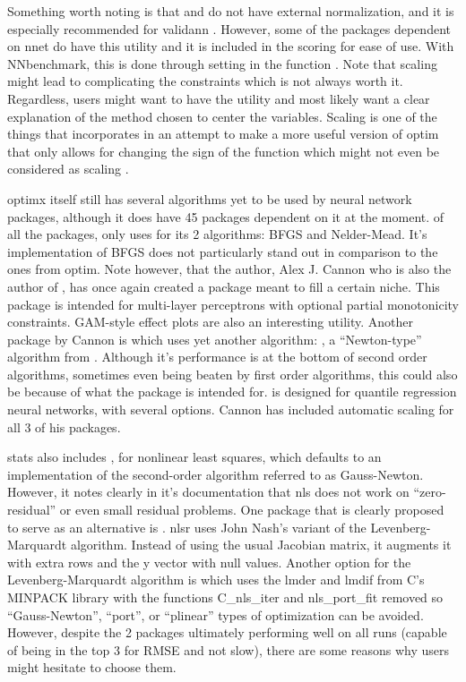 Something worth noting is that  and  do
not have external normalization, and it is especially recommended for
validann . However, some of the packages dependent on nnet do have this
utility and it is included in the scoring for ease of use. With
NNbenchmark, this is done through setting  in the
function . Note that scaling might lead to complicating
the constraints which is not always worth it. Regardless, users might
want to have the utility and most likely want a clear explanation of the
method chosen to center the variables. Scaling is one of the things that
 \citep{R-optimx} incorporates in an attempt to make a
more useful version of optim that only allows for changing the sign of
the function which might not even be considered as scaling
\citep{Nash-nlpor14}.

optimx itself still has several algorithms yet to be used by neural
network packages, although it does have 45 packages dependent on it at
the moment.  \citep{R-monmlp} of all the packages, only
 uses  for its 2 algorithms: BFGS and
Nelder-Mead. It's implementation of BFGS does not particularly stand out
in comparison to the ones from optim. Note however, that the author,
Alex J. Cannon who is also the author of , has once
again created a package meant to fill a certain niche. This package is
intended for multi-layer perceptrons with optional partial monotonicity
constraints. GAM-style effect plots are also an interesting utility.
Another package by Cannon is  \citep{R-qrnn} which uses
yet another algorithm: , a ``Newton-type'' algorithm from
. Although it's performance is at the bottom of second
order algorithms, sometimes even being beaten by first order algorithms,
this could also be because of what the package is intended for.
 is designed for quantile regression neural networks, with
several options. Cannon has included automatic scaling for all 3 of his
packages.

stats also includes , for nonlinear least squares, which
defaults to an implementation of the second-order algorithm referred to
as Gauss-Newton. However, it notes clearly in it's documentation that
nls does not work on ``zero-residual'' or even small residual problems.
One package that is clearly proposed to serve as an alternative is
 \citep{R-nlsr}. nlsr uses John Nash's variant of the
Levenberg-Marquardt algorithm. Instead of using the usual Jacobian
matrix, it augments it with extra rows and the y vector with null
values. Another option for the Levenberg-Marquardt algorithm is
 \citep{minpack.lm} which uses the lmder and lmdif
from C's MINPACK library with the functions C\_nls\_iter and
nls\_port\_fit removed so ``Gauss-Newton'', ``port'', or ``plinear''
types of optimization can be avoided. However, despite the 2 packages
ultimately performing well on all runs (capable of being in the top 3
for RMSE and not slow), there are some reasons why users might hesitate
to choose them.

